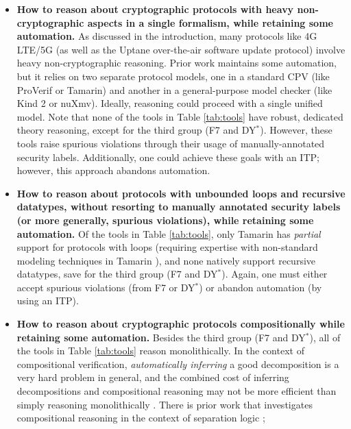 \documentclass{article}
\theoremstyle{definition}
\begin{document}
\begin{itemize}
    \item[\textsf{RQ1.}] 
    \textbf{How to reason about cryptographic protocols with heavy non-cryptographic aspects in a single formalism, 
    while retaining some  automation.} 
    As discussed in the introduction, many protocols like 4G LTE/5G 
    (as well as the Uptane \cite{uptane} over-the-air software update protocol) 
    involve heavy non-cryptographic reasoning. 
    Prior work \cite{5greasoner,lteinspector,uptane_analysis} maintains some automation, 
    but it relies on two separate protocol models, 
    one in a standard CPV (like ProVerif or Tamarin) and another in a general-purpose model checker (like Kind 2 or nuXmv). 
    Ideally, reasoning could proceed with a single unified model. 
    Note that none of the tools in Table \ref{tab:tools} have robust, 
    dedicated theory reasoning, except for the third group (F7 and DY$^*$). 
    However, these tools raise spurious violations through their usage of manually-annotated security labels.  
    Additionally, one could achieve these goals with an ITP; however, this approach abandons automation.
    \item[\textsf{RQ2.}] 
    \textbf{How to reason about protocols with unbounded loops and recursive datatypes, 
    without resorting to manually annotated security labels (or more generally, spurious violations), while retaining some automation.} 
    Of the tools in Table \ref{tab:tools}, only Tamarin has \emph{partial} 
    support for protocols with loops (requiring expertise with non-standard modeling techniques 
    in Tamarin \cite{tamarin_looping}), and none natively support recursive datatypes, 
    save for the third group (F7 and DY$^*$). Again, one must either accept spurious violations 
    (from F7 or DY$^*$) or abandon automation (by using an ITP).
    \item[\textsf{RQ3.}] 
    \textbf{How to reason about cryptographic protocols compositionally while retaining some automation.} 
    Besides the third group (F7 and DY$^*$), all of the tools in Table \ref{tab:tools} reason monolithically. 
    In the context of compositional verification, \emph{automatically inferring} a good decomposition is a very hard problem 
    in general, 
    and the combined cost of inferring decompositions and compositional reasoning may not be more efficient 
    than simply reasoning monolithically
    \cite{cobleigh1,cobleigh2}.
    There is prior work that investigates compositional reasoning in the context of separation logic \cite{generic_methodology}; 

\end{itemize}
\end{document}
